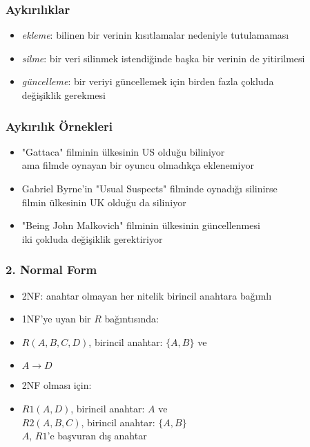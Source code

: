 \documentclass[dvipsnames]{beamer}
\theoremstyle{theorem}
\begin{document}
\begin{frame}
  \frametitle{Aykırılıklar}

  \begin{itemize}
    \item \emph{ekleme}: bilinen bir verinin kısıtlamalar nedeniyle tutulamaması

    \medskip
    \item \emph{silme}: bir veri silinmek istendiğinde başka bir verinin de yitirilmesi

    \medskip
    \item \emph{güncelleme}: bir veriyi güncellemek için birden fazla çokluda\\ 
       değişiklik gerekmesi
  \end{itemize}
\end{frame}

\begin{frame}
  \frametitle{Aykırılık Örnekleri}
     
   \hyperlink{exampl}{} 

    \begin{itemize}
      \item "Gattaca" filminin ülkesinin US olduğu biliniyor\\
	ama filmde oynayan bir oyuncu olmadıkça eklenemiyor

      \pause
      \medskip
      \item Gabriel Byrne'in "Usual Suspects" filminde oynadığı silinirse\\
        filmin ülkesinin UK olduğu da siliniyor

      \pause
      \medskip
      \item "Being John Malkovich" filminin ülkesinin güncellenmesi\\
        iki çokluda değişiklik gerektiriyor
    \end{itemize}
\end{frame}

\begin{frame}
  \frametitle{2. Normal Form}

  \begin{itemize}
    \item \alert{2NF}: anahtar olmayan her nitelik birincil anahtara bağımlı
    
    \pause
    \medskip
    
    \item 1NF'ye uyan bir $R$ bağıntısında:
    \item $R(A,B,C,D)$, birincil anahtar: $\{A,B\}$ ve
    \item $A \rightarrow D$

    \medskip  
    \item 2NF olması için:
    \item $R1(A,D)$, birincil anahtar: $A$ ve \\
      $R2(A,B,C)$, birincil anahtar: $\{A,B\}$\\
      $A$, $R1$'e başvuran dış anahtar
    \end{itemize}
\end{frame}
\end{document}
